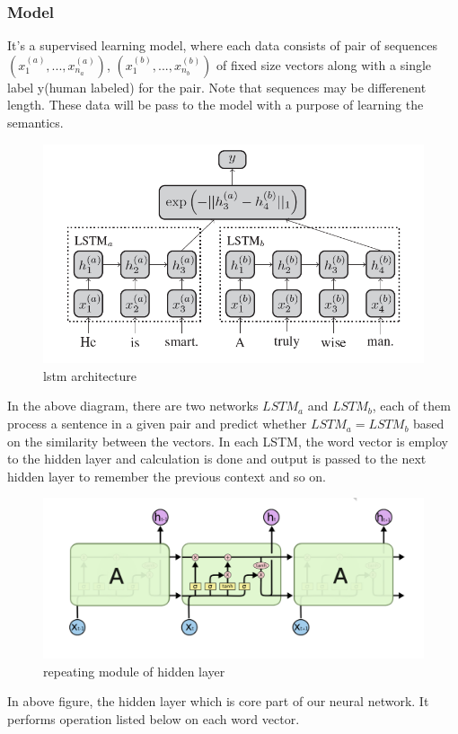 \subsubsection{Model}
\par It's a supervised learning model, where each data consists of pair of sequences 
$(x_1^{(a)},...,x_{n_a}^{(a)})$, $(x_1^{(b)},...,x_{n_b}^{(b)})$ of fixed size vectors along with a single label y(human labeled) for the pair. Note that sequences may be differenent length. These data will be pass to the model with a purpose of learning the semantics. 
 \begin{figure}[h]
    \centering
    \includegraphics[width=.75\textwidth]{lstm_image}
    \caption{lstm architecture}
\end{figure}
In the above diagram, there are two networks $LSTM_a$ and $LSTM_b$, each of them process a sentence in a given pair and predict whether  $LSTM_a=LSTM_b$ based on the similarity between the vectors. In each LSTM, the word vector is employ to the hidden layer and calculation is done and output is passed to the next hidden layer to remember the previous context and so on.
 \begin{figure}[h]
    \centering
    \includegraphics[width=.85\textwidth]{hidden_layer}
    \caption{repeating module of hidden layer}
\end{figure}
In above figure, the hidden layer which is core part of our neural network. It performs operation listed below on each word vector.
